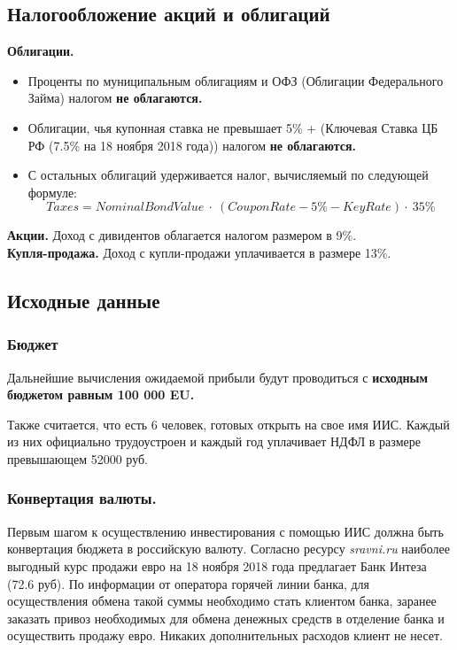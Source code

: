 \subsection{Налогообложение акций и облигаций}

\textbf{Облигации.}
\begin{itemize}
    \item Проценты по муниципальным облигациям и ОФЗ (Облигации Федерального Займа) налогом \textbf{не облагаются.}
    \item Облигации, чья купонная ставка не превышает 5\% + (Ключевая Ставка ЦБ РФ (7.5\% на 18 ноября 2018 года)) налогом \textbf{не облагаются.}
    \item С остальных облигаций удерживается налог, вычисляемый по следующей формуле: 
    $$Taxes = NominalBondValue\ \cdot\ (CouponRate - 5\% - KeyRate) \cdot\ 35\%$$
\end{itemize}
\textbf{Акции.} Доход с дивидентов облагается налогом размером в 9\%.\\
\textbf{Купля-продажа.} Доход с купли-продажи уплачивается в размере 13\%.

\subsection{Исходные данные}
\subsubsection{Бюджет}
Дальнейшие вычисления ожидаемой прибыли  будут проводиться с \textbf{исходным бюджетом равным 100 000 EU.} 

Также считается, что есть 6 человек, готовых открыть на свое имя ИИС. Каждый из них официально трудоустроен и каждый год уплачивает НДФЛ в размере превышающем 52000 руб.
\subsubsection{Конвертация валюты.}
Первым шагом к осуществлению инвестирования с помощью ИИС должна быть конвертация бюджета в российскую валюту. Согласно ресурсу \textit{sravni.ru} наиболее выгодный курс продажи евро на 18 ноября 2018 года предлагает Банк Интеза (72.6 руб). По информации от оператора горячей линии банка, для осуществления обмена такой суммы необходимо стать клиентом банка, заранее заказать привоз необходимых для обмена денежных средств в отделение банка и осуществить продажу евро. Никаких дополнительных расходов клиент не несет.

